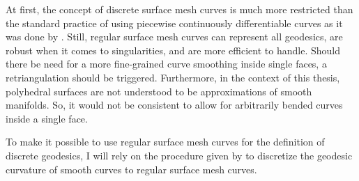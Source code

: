 \documentclass{stdlocal}
\begin{document}
  At first, the concept of discrete surface mesh curves is much more restricted than the standard practice of using piecewise continuously differentiable curves as it was done by \textcite{polthier2006}.
  Still, regular surface mesh curves can represent all geodesics, are robust when it comes to singularities, and are more efficient to handle.
  Should there be need for a more fine-grained curve smoothing inside single faces, a retriangulation should be triggered.
  Furthermore, in the context of this thesis, polyhedral surfaces are not understood to be approximations of smooth manifolds.
  So, it would not be consistent to allow for arbitrarily bended curves inside a single face.


  To make it possible to use regular surface mesh curves for the definition of discrete geodesics, I will rely on the procedure given by \textcite{polthier2006} to discretize the geodesic curvature of smooth curves to regular surface mesh curves.

\end{document}
